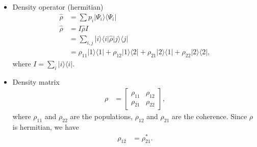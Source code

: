 \documentclass[../../note.tex]{subfiles}
\begin{document}
\begin{itemize}
    \item Density operator (hermitian)
    \begin{align}
        \hat{\rho}
        &= \sum p_i \vert \Psi_i \rangle \langle \Psi_i \vert \\
        \hat{\rho}
        &= I \hat{\rho} I \\
        &= \sum_{i,j} \vert i \rangle \langle i \vert \hat{\rho} \vert j \rangle \langle j \vert \\
        &= \rho_{11} \vert 1 \rangle \langle  1 \vert + \rho_{12} \vert 1 \rangle \langle 2 \vert + \rho_{21} \vert 2 \rangle \langle 1 \vert + \rho_{22} \vert 2 \rangle \langle 2 \vert,
    \end{align}
    where $I = \sum_i \vert i \rangle \langle i \vert$.
    \item Density matrix
    \begin{align}
        \rho
        &= \left[\begin{matrix}
            \rho_{11} & \rho_{12} \\
            \rho_{21} & \rho_{22}
        \end{matrix}\right],
    \end{align}
    where $\rho_{11}$ and $\rho_{22}$ are the populations, $\rho_{12}$ and $\rho_{21}$ are the coherence. Since $\rho$ is hermitian, we have
    \begin{align}
        \rho_{12}
        &= \rho_{21}^\ast.
    \end{align}
\end{itemize}
\end{document}
